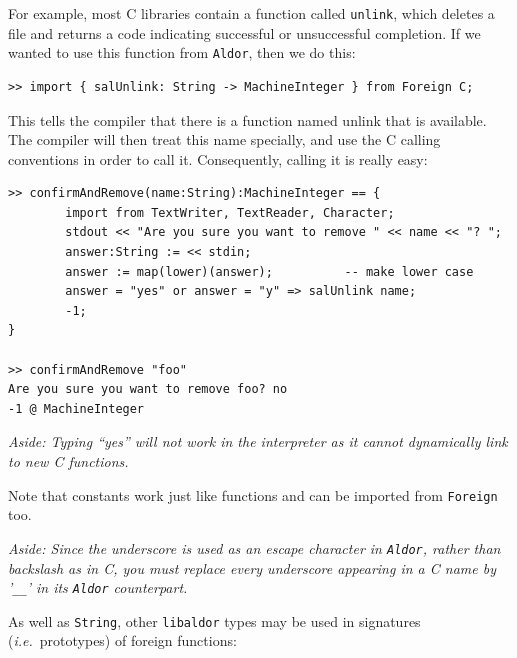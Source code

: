 \documentclass{article}
\newcommand{\ie}{{\it i.e.}}
\newcommand{\libaldor}{{\tt libaldor}}
\newcommand{\Aldor}{{\tt Aldor}}
\begin{document}
For example, most C libraries contain a function called {\tt unlink},
which deletes a file and returns a code indicating successful
or unsuccessful completion.
If we wanted to use this function from \Aldor{}, then we do this:

\begin{small}
\begin{verbatim}
>> import { salUnlink: String -> MachineInteger } from Foreign C;
\end{verbatim}
\end{small}

This tells the compiler that there is a function named unlink
that is available. %
The compiler will then treat this name specially, and use the C
calling conventions in order to call it.  Consequently, calling it
is really easy:

\begin{small}
\begin{verbatim}
>> confirmAndRemove(name:String):MachineInteger == {
        import from TextWriter, TextReader, Character;
        stdout << "Are you sure you want to remove " << name << "? ";
        answer:String := << stdin;
        answer := map(lower)(answer);          -- make lower case
        answer = "yes" or answer = "y" => salUnlink name;
        -1;
}

>> confirmAndRemove "foo"
Are you sure you want to remove foo? no 
-1 @ MachineInteger
\end{verbatim}
\end{small}

{\em Aside: Typing ``yes'' will not work in the interpreter as it cannot
dynamically link to new C functions.}

Note that constants work just like functions and can be imported from
{\tt Foreign} too.

{\em Aside:
Since the underscore is used as an escape character in \Aldor{},
rather than backslash as in C, you must replace every underscore
appearing in a C name by '\verb!__!' in its \Aldor{} counterpart.}

As well as {\tt String}, other \libaldor{} types may be used in
signatures (\ie~prototypes) of foreign functions:
\end{document}
